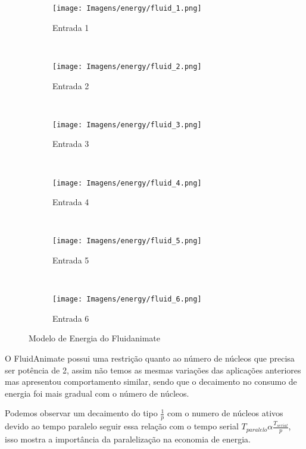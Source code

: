 \begin{figure}[H]
    \centering
    \begin{subfigure}[t]{0.5\textwidth}
        \centering
        \texttt{[image: Imagens/energy/fluid\_1.png]}
        \caption{Entrada 1}
    \end{subfigure}%
    ~ 
    \begin{subfigure}[t]{0.5\textwidth}
        \centering
        \texttt{[image: Imagens/energy/fluid\_2.png]}
        \caption{Entrada 2}
    \end{subfigure}
    \\
    \centering
    \begin{subfigure}[t]{0.5\textwidth}
        \centering
        \texttt{[image: Imagens/energy/fluid\_3.png]}
        \caption{Entrada 3}
    \end{subfigure}%
    ~ 
    \begin{subfigure}[t]{0.5\textwidth}
        \centering
        \texttt{[image: Imagens/energy/fluid\_4.png]}
        \caption{Entrada 4}
    \end{subfigure}
    \\
    \centering
    \begin{subfigure}[t]{0.5\textwidth}
        \centering
        \texttt{[image: Imagens/energy/fluid\_5.png]}
        \caption{Entrada 5}
    \end{subfigure}%
    ~ 
    \begin{subfigure}[t]{0.5\textwidth}
        \centering
        \texttt{[image: Imagens/energy/fluid\_6.png]}
        \caption{Entrada 6}
    \end{subfigure}
    
    \caption{Modelo de Energia do Fluidanimate}
    \label{fig:energia_fluid}
\end{figure}

O FluidAnimate possui uma restrição quanto ao número de núcleos que precisa ser potência de 2, assim não temos as mesmas variações das aplicações anteriores mas apresentou comportamento similar, sendo que o decaimento no consumo de energia foi mais gradual com o número de núcleos.

Podemos observar um decaimento do tipo $\frac{1}{p}$ com o numero de núcleos ativos devido ao tempo paralelo seguir essa relação com o tempo serial $T_{paralelo} \alpha \frac{T_{serial}}{p}$, isso mostra a importância da paralelização na economia de energia.

